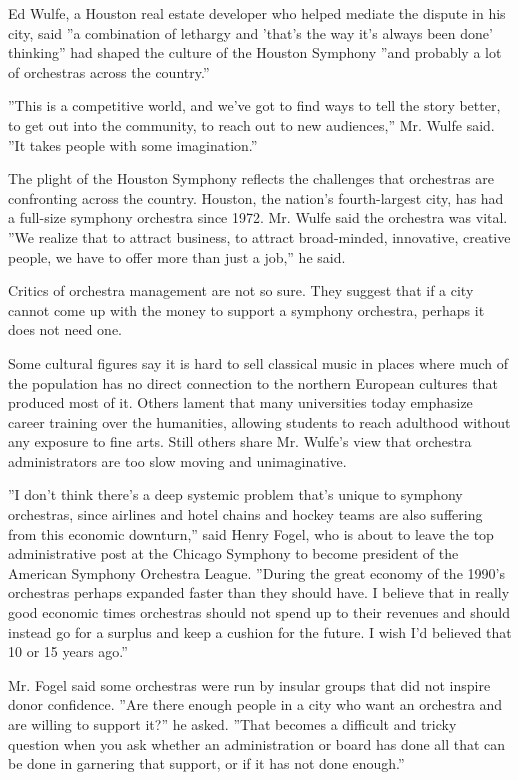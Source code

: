 Ed Wulfe, a Houston real estate developer who helped mediate the dispute
in his city, said ''a combination of lethargy and 'that's the way it's
always been done' thinking'' had shaped the culture of the Houston
Symphony ''and probably a lot of orchestras across the country.''

''This is a competitive world, and we've got to find ways to tell the
story better, to get out into the community, to reach out to new
audiences,'' Mr. Wulfe said. ''It takes people with some imagination.''

The plight of the Houston Symphony reflects the challenges that
orchestras are confronting across the country. Houston, the nation's
fourth-largest city, has had a full-size symphony orchestra since 1972.
Mr. Wulfe said the orchestra was vital. ''We realize that to attract
business, to attract broad-minded, innovative, creative people, we have
to offer more than just a job,'' he said.

Critics of orchestra management are not so sure. They suggest that if a
city cannot come up with the money to support a symphony orchestra,
perhaps it does not need one.

Some cultural figures say it is hard to sell classical music in places
where much of the population has no direct connection to the northern
European cultures that produced most of it. Others lament that many
universities today emphasize career training over the humanities,
allowing students to reach adulthood without any exposure to fine arts.
Still others share Mr. Wulfe's view that orchestra administrators are
too slow moving and unimaginative.

''I don't think there's a deep systemic problem that's unique to
symphony orchestras, since airlines and hotel chains and hockey teams
are also suffering from this economic downturn,'' said Henry Fogel, who
is about to leave the top administrative post at the Chicago Symphony to
become president of the American Symphony Orchestra League. ''During the
great economy of the 1990's orchestras perhaps expanded faster than they
should have. I believe that in really good economic times orchestras
should not spend up to their revenues and should instead go for a
surplus and keep a cushion for the future. I wish I'd believed that 10
or 15 years ago.''

Mr. Fogel said some orchestras were run by insular groups that did not
inspire donor confidence. ''Are there enough people in a city who want
an orchestra and are willing to support it?'' he asked. ''That becomes a
difficult and tricky question when you ask whether an administration or
board has done all that can be done in garnering that support, or if it
has not done enough.''

